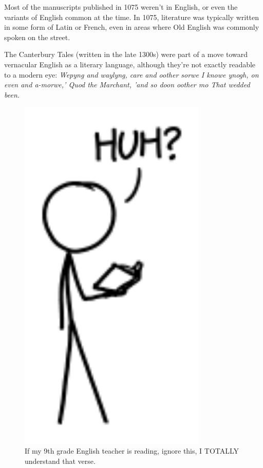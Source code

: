 {{Most of the manuscripts published in 1075 weren't in English, or even the variants of English common at the time. In 1075, literature was typically written in some form of Latin or French, even in areas where Old English was commonly spoken on the street.}

{The Canterbury Tales (written in the late 1300s) were part of a move toward vernacular English as a literary language, although they're not exactly readable to a modern eye:}
\emph{Wepyng and waylyng, care and oother sorwe
I knowe ynogh, on even and a-morwe,'
Quod the Marchant, 'and so doon oother mo
That wedded been.} 
\begin{figure}[!htbp]
\centering
\includegraphics[scale=0.5, max width=0.8\textwidth]{imgs/a/76/books_what.png}
\caption{If my 9th grade English teacher is reading, ignore this, I TOTALLY understand that verse.}
\end{figure}

}
